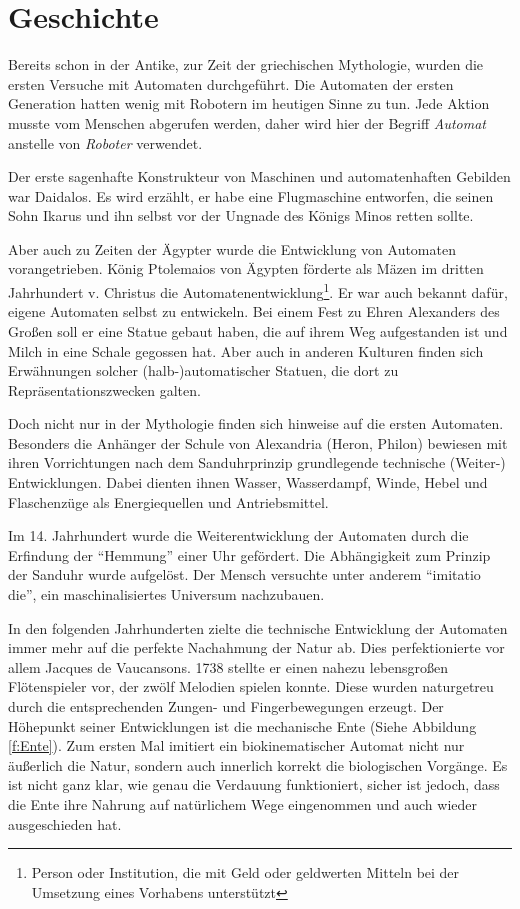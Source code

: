 \section{Geschichte}
Bereits schon in der Antike, zur Zeit der griechischen Mythologie, wurden die ersten Versuche mit Automaten durchgeführt. Die Automaten der ersten Generation hatten wenig mit Robotern im heutigen Sinne zu tun. Jede Aktion musste vom Menschen abgerufen werden, daher wird hier der Begriff \textit{Automat} anstelle von \textit{Roboter} verwendet.

Der erste sagenhafte Konstrukteur von Maschinen und automatenhaften Gebilden war Daidalos. Es wird erzählt, er habe eine Flugmaschine entworfen, die seinen Sohn Ikarus und ihn selbst vor der Ungnade des Königs Minos retten sollte. 

Aber auch zu Zeiten der Ägypter wurde die Entwicklung von Automaten vorangetrieben. König Ptolemaios von Ägypten förderte als Mäzen im dritten Jahrhundert v. Christus die Automatenentwicklung\footnote{Person oder Institution, die mit Geld oder geldwerten Mitteln bei der Umsetzung eines Vorhabens unterstützt}. Er war auch bekannt dafür, eigene Automaten selbst zu entwickeln. Bei einem Fest zu Ehren Alexanders des Großen soll er eine Statue gebaut haben, die auf ihrem Weg aufgestanden ist und Milch in eine Schale gegossen hat. Aber auch in anderen Kulturen finden sich Erwähnungen solcher (halb-)automatischer Statuen, die dort zu Repräsentationszwecken galten.

Doch nicht nur in der Mythologie finden sich hinweise auf die ersten Automaten. Besonders die Anhänger der Schule von Alexandria (Heron, Philon) bewiesen mit ihren Vorrichtungen nach dem Sanduhrprinzip grundlegende technische (Weiter-) Entwicklungen. Dabei dienten ihnen Wasser, Wasserdampf, Winde, Hebel und Flaschenzüge als Energiequellen und Antriebsmittel.

Im 14. Jahrhundert wurde die Weiterentwicklung der Automaten durch die Erfindung der "`Hemmung"' einer Uhr gefördert. Die Abhängigkeit zum Prinzip der Sanduhr wurde aufgelöst. Der Mensch versuchte unter anderem "`imitatio die"', ein maschinalisiertes Universum nachzubauen. 

In den folgenden Jahrhunderten zielte die technische Entwicklung der Automaten immer mehr auf die perfekte Nachahmung der Natur  ab. Dies perfektionierte vor allem Jacques de Vaucansons. 1738 stellte er einen nahezu lebensgroßen Flötenspieler vor, der zwölf Melodien spielen konnte. Diese wurden naturgetreu durch die entsprechenden Zungen- und Fingerbewegungen erzeugt. Der Höhepunkt seiner Entwicklungen ist die mechanische Ente (Siehe Abbildung \ref{f:Ente}). Zum ersten Mal imitiert ein biokinematischer Automat nicht nur äußerlich die Natur, sondern auch innerlich korrekt die biologischen Vorgänge. Es ist nicht ganz klar, wie genau die Verdauung funktioniert, sicher ist jedoch, dass die Ente ihre Nahrung auf natürlichem Wege eingenommen und auch wieder ausgeschieden hat.  

